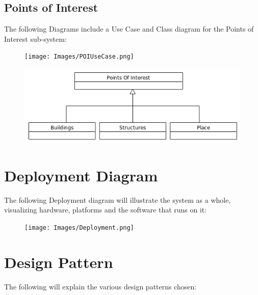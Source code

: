 \documentclass{article}
\begin{document}
	\subsection{Points of Interest}
	The following Diagrams include a Use Case and Class diagram for the Points of Interest sub-system:
	\FloatBarrier	
	\begin{figure}[h]
  		\texttt{[image: Images/POIUseCase.png]}
	\end{figure}
	\begin{figure}[h]
  		\includegraphics[width=\textwidth]{Images/POIClass.png}
	\end{figure}
	\FloatBarrier	
\section{Deployment Diagram}
The following Deployment diagram will illustrate the system as a whole, visualizing hardware, platforms and the software that runs on it:
	\FloatBarrier	
	\begin{figure}[h]
  		\texttt{[image: Images/Deployment.png]}
	\end{figure}
	\FloatBarrier	

\section{Design Pattern}
The following will explain the various design patterns chosen:
\end{document}
